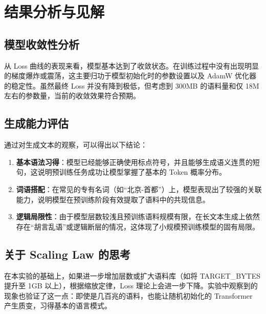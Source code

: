 \documentclass[a4paper,12pt]{ctexart} %
\begin{document}
\section{结果分析与见解}

\subsection{模型收敛性分析}
从 Loss 曲线的表现来看，模型基本达到了收敛状态。在训练过程中没有出现明显的梯度爆炸或震荡，这主要归功于模型初始化时的参数设置以及 AdamW 优化器的稳定性。虽然最终 Loss 并没有降到极低，但考虑到 300MB 的语料量和仅 18M 左右的参数量，当前的收敛效果符合预期。

\subsection{生成能力评估}
通过对生成文本的观察，可以得出以下结论：
\begin{enumerate}
    \item \textbf{基本语法习得}：模型已经能够正确使用标点符号，并且能够生成语义连贯的短句，这说明预训练任务成功让模型掌握了基本的 Token 概率分布。
    \item \textbf{词语搭配}：在常见的专有名词（如“北京-首都”）上，模型表现出了较强的关联能力，说明模型在预训练阶段有效提取了语料中的共现信息。
    \item \textbf{逻辑局限性}：由于模型层数较浅且预训练语料规模有限，在长文本生成上依然存在“胡言乱语”或逻辑断层的情况，这体现了小规模预训练模型的固有局限。
\end{enumerate}

\subsection{关于 Scaling Law 的思考}
在本实验的基础上，如果进一步增加层数或扩大语料库（如将 TARGET\_BYTES 提升至 1GB 以上），根据缩放定律，Loss 理论上会进一步下降。实验中观察到的现象也验证了这一点：即使是几百兆的语料，也能让随机初始化的 Transformer 产生质变，习得基本的语言模式。
\end{document}
